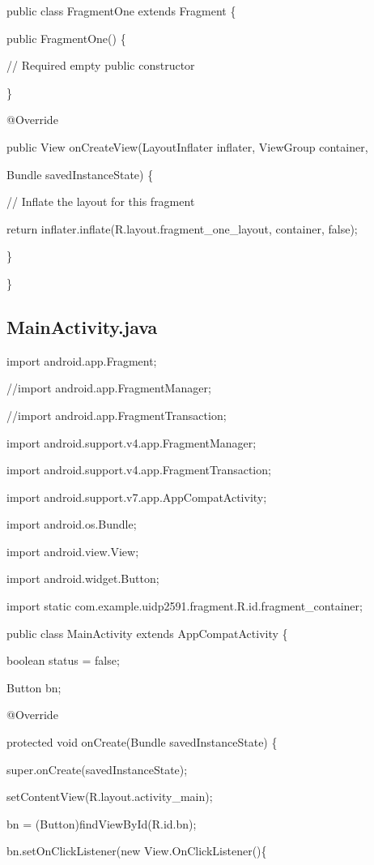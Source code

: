 \documentclass{article}
\begin{document}
public class FragmentOne extends Fragment \{

public FragmentOne() \{

// Required empty public constructor

\}

@Override

public View onCreateView(LayoutInflater inflater, ViewGroup container,

Bundle savedInstanceState) \{

// Inflate the layout for this fragment

return inflater.inflate(R.layout.fragment\_one\_layout, container, false);

\}

\}

\bigskip 

\bigskip 

\subsection{MainActivity.java}

\bigskip 

import android.app.Fragment;

//import android.app.FragmentManager;

//import android.app.FragmentTransaction;

import android.support.v4.app.FragmentManager;

import android.support.v4.app.FragmentTransaction;

import android.support.v7.app.AppCompatActivity;

import android.os.Bundle;

import android.view.View;

import android.widget.Button;

import static com.example.uidp2591.fragment.R.id.fragment\_container;

public class MainActivity extends AppCompatActivity \{

boolean status = false;

Button bn;

@Override

protected void onCreate(Bundle savedInstanceState) \{

super.onCreate(savedInstanceState);

setContentView(R.layout.activity\_main);

bn = (Button)findViewById(R.id.bn);

bn.setOnClickListener(new View.OnClickListener()\{
\end{document}

